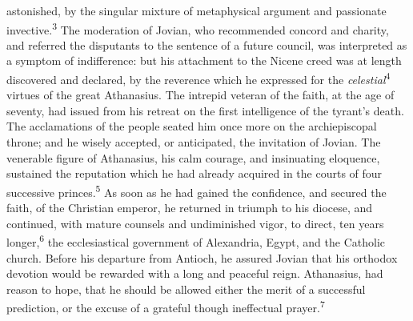 astonished, by the singular mixture of metaphysical argument and
passionate invective.\textsuperscript{3} The moderation of Jovian, who recommended
concord and charity, and referred the disputants to the sentence
of a future council, was interpreted as a symptom of
indifference: but his attachment to the Nicene creed was at
length discovered and declared, by the reverence which he
expressed for the \textit{celestial}\textsuperscript{4} virtues of the great Athanasius.
The intrepid veteran of the faith, at the age of seventy, had
issued from his retreat on the first intelligence of the tyrant’s
death. The acclamations of the people seated him once more on the
archiepiscopal throne; and he wisely accepted, or anticipated,
the invitation of Jovian. The venerable figure of Athanasius, his
calm courage, and insinuating eloquence, sustained the reputation
which he had already acquired in the courts of four successive
princes.\textsuperscript{5} As soon as he had gained the confidence, and secured
the faith, of the Christian emperor, he returned in triumph to
his diocese, and continued, with mature counsels and undiminished
vigor, to direct, ten years longer,\textsuperscript{6} the ecclesiastical
government of Alexandria, Egypt, and the Catholic church. Before
his departure from Antioch, he assured Jovian that his orthodox
devotion would be rewarded with a long and peaceful reign.
Athanasius, had reason to hope, that he should be allowed either
the merit of a successful prediction, or the excuse of a grateful
though ineffectual prayer.\textsuperscript{7}





